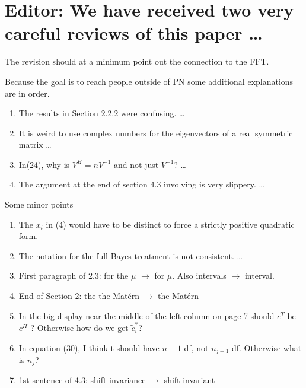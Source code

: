 \documentclass{amsart}
\newcommand{\vV}{\boldsymbol{V}}
\newcommand{\vone}{\boldsymbol{1}}
\begin{document}
\section*{Editor: We have received two very careful reviews of this paper \ldots}


The revision should at a minimum point out the connection to the FFT. 

Because the goal is to reach people outside of PN some additional explanations are in order.

\begin{enumerate}
\renewcommand{\labelenumi}{\arabic{enumi}.}
    \item The results in Section 2.2.2 were confusing. \ldots 

    \item It is weird to use complex numbers for the eigenvectors of a real symmetric matrix \ldots {}

\item In(24), why is $V^H =nV^{-1}$ and not just $V^{-1}$? \ldots \Response{This normalization allows $\vV_1 = \vone$.}

\item The argument at the end of section 4.3 involving is very slippery. \ldots

\end{enumerate} 


Some minor points

\begin{enumerate}
\renewcommand{\labelenumi}{\arabic{enumi}.}

\item The $x_i$ in (4) would have to be distinct to force a strictly positive quadratic form. 

\item The notation for the full Bayes treatment is not consistent. \ldots 
\item  First paragraph of 2.3: for the $\mu$ $\rightarrow$ for $\mu$. Also intervals $\rightarrow$ interval. 
\item  End of Section 2: the the Mat\'ern $\rightarrow$ the Mat\'ern 
\item  In the big display near the middle of the left column on page 7 should $c^T$
be $c^H$ ? Otherwise how do we get $\tilde{c}^*_i$? 
\item  In equation (30), I think t should have $n-1$ df, not $n_{j-1}$ df. Otherwise
what is $n_j$?  
\item  1st sentence of 4.3: shift-invariance $\rightarrow$ shift-invariant 

\end{enumerate}
\end{document}
